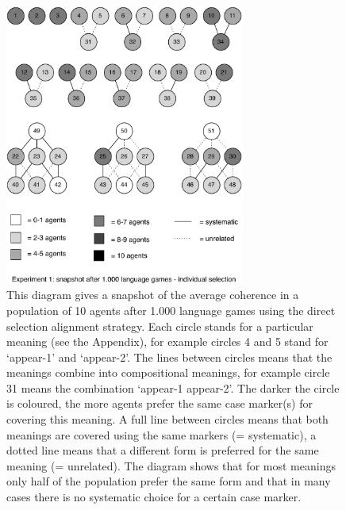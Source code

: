 \begin{figure}[p]
\centerline{\includegraphics[width=0.7\textwidth]{Chapter4/figs/direct-coherence-no-analogy-1000}}
  \caption[Experiment 1: snapshot after 1.000 games]{This diagram gives a snapshot of the average coherence in a population of 10 agents after 1.000 language games using the direct selection alignment strategy. Each circle stands for a particular meaning (see the Appendix), for example circles 4 and 5 stand for `appear-1' and `appear-2'. The lines between circles means that the meanings combine into compositional meanings, for example circle 31 means the combination `appear-1 appear-2'. The darker the circle is coloured, the more agents prefer the same case marker(s) for covering this meaning. A full line between circles means that both meanings are covered using the same markers (= systematic), a dotted line means that a different form is preferred for the same meaning (= unrelated). The diagram shows that for most meanings only half of the population prefer the same form and that in many cases there is no systematic choice for a certain case marker.}
   \label{f:1-coherence-1000}
\end{figure}

